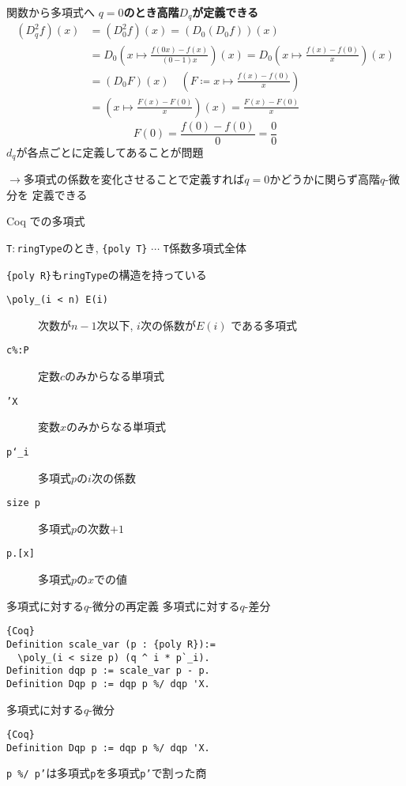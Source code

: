 \documentclass[dvipdfmx,cjk]{beamer}
\theoremstyle{mystyle}
\newcommand{\0}{\textbf{0}}
\begin{document}
\begin{frame}{関数から多項式へ}
	\textbf{$q = 0$のとき高階$D_q$が定義できる}	
	\begin{align*}
		(D_q ^2 f) (x) &= (D_0 ^2 f) (x) = (D_0 (D_0 f)) (x) \\
								&= D_0 \left(x \mapsto \frac{f (0 x) - f(x)}{(0 - 1)x} \right) (x)
									= D_0 \left(x \mapsto \frac{f(x) - f(0)}{x} \right) (x) \\
								&= (D_0 F) (x) \quad
									(F \coloneqq x \mapsto \frac{f(x) - f(0)}{x})\\
								&= \left( x \mapsto \frac{F(x) - F(0)}{x} \right) (x)
									= \frac{F(x) - F(0)}{x}
	\end{align*}
	\[
		F(0) = \frac{f(0) - f(0)}{0} = \frac{0}{0}
	\]
	$d_q$が各点ごとに定義してあることが問題
	
	$\to$多項式の係数を変化させることで定義すれば$q = 0$かどうかに関らず高階$q$-微分を
	定義できる
\end{frame}

\begin{frame}{Coq での多項式}

	{\tt T}$\colon${\tt ringType}のとき, {\tt \{poly T\}} $\cdots$ {\tt T}係数多項式全体
	
	{\tt \{poly R\}}も{\tt ringType}の構造を持っている
	\begin{description}
	  \item[\tt \textbackslash poly\_(i < n) E(i)] 次数が$n - 1$次以下, $i$次の係数が$E(i)$
	    である多項式
	  \item[\tt c\%:P] 定数$c$のみからなる単項式
	  \item[\tt 'X] 変数$x$のみからなる単項式
	  \item[\tt p`\_i] 多項式$p$の$i$次の係数 
	  \item[\tt size p] 多項式$p$の次数$+1$
	  \item[{\tt p.[x]}] 多項式$p$の$x$での値 
	\end{description}
\end{frame}

\begin{frame}[fragile]{多項式に対する$q$-微分の再定義}
	多項式に対する$q$-差分
	\begin{lstlisting}{Coq}
Definition scale_var (p : {poly R}):=
  \poly_(i < size p) (q ^ i * p`_i).
Definition dqp p := scale_var p - p. 
Definition Dqp p := dqp p %/ dqp 'X.
\end{lstlisting}
	多項式に対する$q$-微分
	\begin{lstlisting}{Coq}
Definition Dqp p := dqp p %/ dqp 'X.
\end{lstlisting}
	{\tt p \%/ p'}は多項式{\tt p}を多項式{\tt p'}で割った商
\end{frame}
\end{document}
